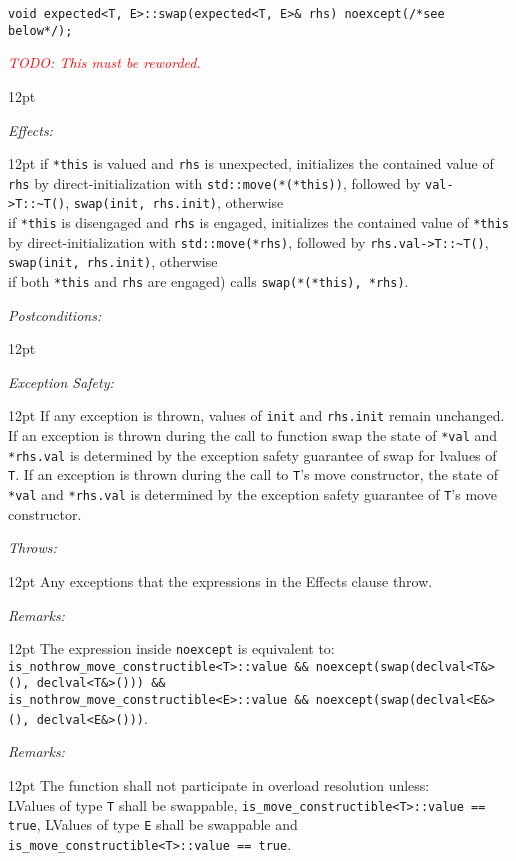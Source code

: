 \documentclass[a4paper,10pt]{article}
\newcommand{\cpp}[1]{\lstinline{#1}}
\newcommand{\todo}[1]{\emph{\textcolor{red}{TODO: #1}}}
\newcommand{\wordingItem}[1]{\noindent\textit{#1:}}
\newenvironment{wordingTextItem}[1]{\wordingItem{#1}\vspace{7pt}\noindent\begin{adjustwidth}{12pt}{}}{\vspace{7pt}\end{adjustwidth}}
\newenvironment{wordingPara}{\begin{adjustwidth}{12pt}{}}{\end{adjustwidth}}
\begin{document}
\begin{lstlisting}[xleftmargin=0pt]
void expected<T, E>::swap(expected<T, E>& rhs) noexcept(/*see below*/); 
\end{lstlisting}
\todo{This must be reworded.}
\begin{wordingPara}


\begin{wordingTextItem}{Effects}
if \cpp{*this} is valued and \cpp{rhs} is unexpected, initializes the contained value of \cpp{rhs} by direct-initialization with \cpp{std::move(*(*this))}, followed by \cpp{val->T::~T()}, \cpp{swap(init, rhs.init)}, otherwise \\
if \cpp{*this} is disengaged and \cpp{rhs} is engaged, initializes the contained value of \cpp{*this} by direct-initialization with \cpp{std::move(*rhs)}, followed by \cpp{rhs.val->T::~T()}, \cpp{swap(init, rhs.init)}, otherwise \\
if both \cpp{*this} and \cpp{rhs} are engaged) calls \cpp{swap(*(*this), *rhs)}. 
\end{wordingTextItem}
\begin{wordingTextItem}{Postconditions}
\end{wordingTextItem}
\begin{wordingTextItem}{Exception Safety}
If any exception is thrown, values of \cpp{init} and \cpp{rhs.init} remain unchanged. If an exception is thrown during the call to function swap the state of \cpp{*val} and \cpp{*rhs.val} is determined by the exception safety guarantee of swap for lvalues of \cpp{T}. If an exception is thrown during the call to \cpp{T}'s move constructor, the state of \cpp{*val} and \cpp{*rhs.val} is determined by the exception safety guarantee of \cpp{T}'s move constructor.
\end{wordingTextItem}
\begin{wordingTextItem}{Throws}
Any exceptions that the expressions in the Effects clause throw.
\end{wordingTextItem}
\begin{wordingTextItem}{Remarks}
The expression inside \cpp{noexcept} is equivalent to: \\
\cpp{is_nothrow_move_constructible<T>::value && noexcept(swap(declval<T&>(), declval<T&>())) &&} \\
\cpp{is_nothrow_move_constructible<E>::value && noexcept(swap(declval<E&>(), declval<E&>()))}.
\end{wordingTextItem}
\begin{wordingTextItem}{Remarks}
The function shall not participate in overload resolution unless: \\
LValues of type \cpp{T} shall be swappable, \cpp{is_move_constructible<T>::value == true}, LValues of type \cpp{E} shall be swappable and \cpp{is_move_constructible<T>::value == true}.
\end{wordingTextItem}
\end{wordingPara}
\end{document}

